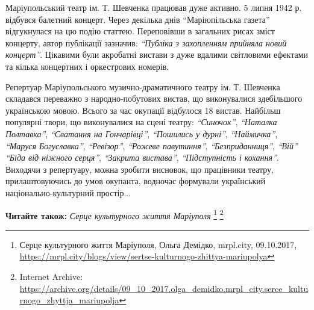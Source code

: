 Маріупольський театр ім. Т. Шевченка працював дуже активно. 5 липня 1942 р.
відбувся балетний концерт. Через декілька днів \enquote{Маріюпільська газета}
відгукнулася на цю подію статтею. Переповівши в загальних рисах зміст концерту,
автор публікації зазначив: \emph{\enquote{Публіка з захопленням прийняла новий концерт}}.
Цікавими були акробатні вистави з дуже вдалими світловими ефектами та кілька
концертних і оркестрових номерів.

Репертуар Маріупольського музично-драматичного театру ім. Т. Шевченка складався
переважно з народно-побутових вистав, що виконувалися здебільшого українською
мовою. Всього за час окупації відбулося 18 вистав. Найбільш популярні твори, що
виконувалися на сцені театру: \emph{\enquote{Синочок}}, \emph{\enquote{Наталка
Полтавка}}, \emph{\enquote{Сватання на Гончарівці}}, \emph{\enquote{Пошились у
дурні}}, \emph{\enquote{Наймичка}}, \emph{\enquote{Маруся Богуславка}},
\emph{\enquote{Ревізор}}, \emph{\enquote{Рожеве павутиння}},
\emph{\enquote{Безприданниця}}, \emph{\enquote{Вій}} \emph{\enquote{Біда від
ніжного серця}}, \emph{\enquote{Закрита вистава}}, \emph{\enquote{Підступність
і кохання}}. Виходячи з репертуару, можна зробити висновок, що працівники
театру, прилаштовуючись до умов окупанта, водночас формували український
національно-культурний простір...

\textbf{Читайте також:} \emph{Серце культурного життя Маріуполя}%
\footnote{Серце культурного життя Маріуполя, Ольга Демідко, mrpl.city, 09.10.2017, \url{https://mrpl.city/blogs/view/sertse-kulturnogo-zhittya-mariupolya} } %
\footnote{Internet Archive: \url{https://archive.org/details/09_10_2017.olga_demidko.mrpl_city.serce_kulturnogo_zhyttja_mariupolja}}
